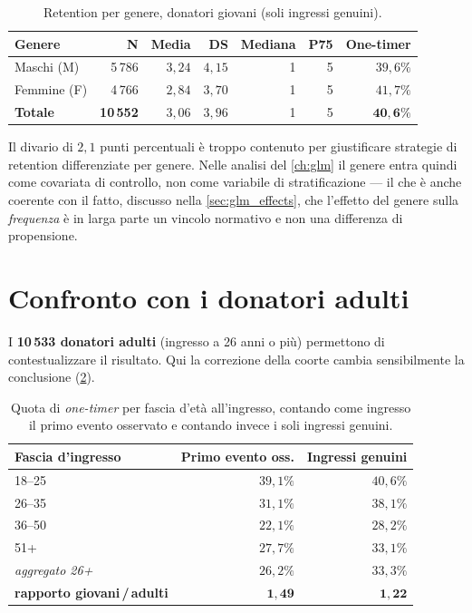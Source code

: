 \begin{table}[ht]
\centering
\caption{Retention per genere, donatori giovani (soli ingressi genuini).}
\label{tab:ret_gender}
\begin{tabular}{@{}lrrrrrr@{}}
\toprule
\textbf{Genere} & \textbf{N} & \textbf{Media} & \textbf{DS} &
\textbf{Mediana} & \textbf{P75} & \textbf{One-timer} \\
\midrule
Maschi  (M) & 5\,786 & $3{,}24$ & $4{,}15$ & 1 & 5 & $39{,}6\%$ \\
Femmine (F) & 4\,766 & $2{,}84$ & $3{,}70$ & 1 & 5 & $41{,}7\%$ \\
\midrule
\textbf{Totale} & \textbf{10\,552} & $3{,}06$ & $3{,}96$ & 1 & 5 & $\mathbf{40{,}6\%}$ \\
\bottomrule
\end{tabular}
\end{table}

Il divario di $2{,}1$ punti percentuali è troppo contenuto per giustificare
strategie di retention differenziate per genere. Nelle analisi del
\cref{ch:glm} il genere entra quindi come covariata di controllo, non come
variabile di stratificazione --- il che è anche coerente con il fatto, discusso
nella \cref{sec:glm_effects}, che l'effetto del genere sulla \emph{frequenza} è
in larga parte un vincolo normativo e non una differenza di propensione.

\section{Confronto con i donatori adulti}
\label{sec:ret_comparison}

I \textbf{10\,533 donatori adulti} (ingresso a 26 anni o più) permettono di
contestualizzare il risultato. Qui la correzione della coorte cambia
sensibilmente la conclusione (\cref{tab:ret_fasce}).

\begin{table}[ht]
\centering
\caption{Quota di \emph{one-timer} per fascia d'età all'ingresso, contando
come ingresso il primo evento osservato e contando invece i soli ingressi
genuini.}
\label{tab:ret_fasce}
\begin{tabular}{@{}lrr@{}}
\toprule
\textbf{Fascia d'ingresso} & \textbf{Primo evento oss.} & \textbf{Ingressi genuini} \\
\midrule
18--25 & $39{,}1\%$ & $40{,}6\%$ \\
26--35 & $31{,}1\%$ & $38{,}1\%$ \\
36--50 & $22{,}1\%$ & $28{,}2\%$ \\
51+    & $27{,}7\%$ & $33{,}1\%$ \\
\midrule
\emph{aggregato 26+} & $26{,}2\%$ & $33{,}3\%$ \\
\midrule
\textbf{rapporto giovani\,/\,adulti} & $\mathbf{1{,}49}$ & $\mathbf{1{,}22}$ \\
\bottomrule
\end{tabular}
\end{table}

